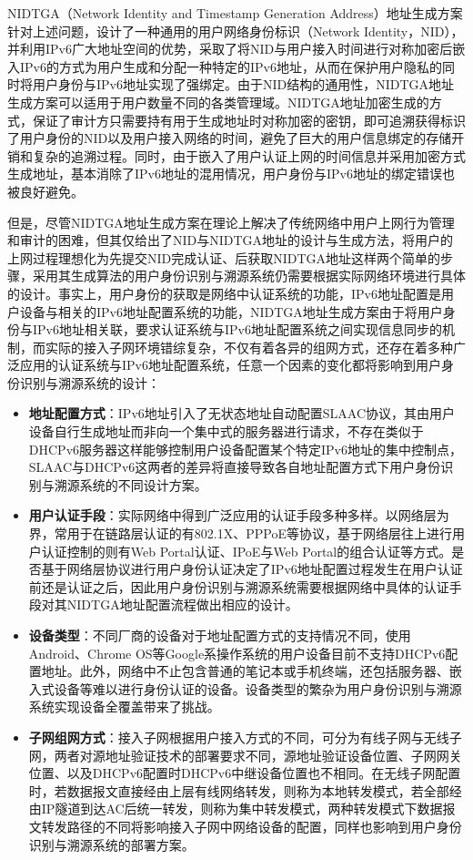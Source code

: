   NIDTGA（Network Identity and Timestamp Generation Address）地址生成方案\cite{liu2015building}针对上述问题，设计了一种通用的用户网络身份标识（Network Identity，NID），并利用IPv6广大地址空间的优势，采取了将NID与用户接入时间进行对称加密后嵌入IPv6的方式为用户生成和分配一种特定的IPv6地址，从而在保护用户隐私的同时将用户身份与IPv6地址实现了强绑定。由于NID结构的通用性，NIDTGA地址生成方案可以适用于用户数量不同的各类管理域。NIDTGA地址加密生成的方式，保证了审计方只需要持有用于生成地址时对称加密的密钥，即可追溯获得标识了用户身份的NID以及用户接入网络的时间，避免了巨大的用户信息绑定的存储开销和复杂的追溯过程。同时，由于嵌入了用户认证上网的时间信息并采用加密方式生成地址，基本消除了IPv6地址的混用情况，用户身份与IPv6地址的绑定错误也被良好避免。

  但是，尽管NIDTGA地址生成方案在理论上解决了传统网络中用户上网行为管理和审计的困难，但其仅给出了NID与NIDTGA地址的设计与生成方法，将用户的上网过程理想化为先提交NID完成认证、后获取NIDTGA地址这样两个简单的步骤，采用其生成算法的用户身份识别与溯源系统仍需要根据实际网络环境进行具体的设计。事实上，用户身份的获取是网络中认证系统的功能，IPv6地址配置是用户设备与相关的IPv6地址配置系统的功能，NIDTGA地址生成方案由于将用户身份与IPv6地址相关联，要求认证系统与IPv6地址配置系统之间实现信息同步的机制，而实际的接入子网环境错综复杂，不仅有着各异的组网方式，还存在着多种广泛应用的认证系统与IPv6地址配置系统，任意一个因素的变化都将影响到用户身份识别与溯源系统的设计：
  \begin{itemize}
    \item \textbf{地址配置方式}：IPv6地址引入了无状态地址自动配置SLAAC协议，其由用户设备自行生成地址而非向一个集中式的服务器进行请求，不存在类似于DHCPv6服务器这样能够控制用户设备配置某个特定IPv6地址的集中控制点，SLAAC与DHCPv6这两者的差异将直接导致各自地址配置方式下用户身份识别与溯源系统的不同设计方案。
    \item \textbf{用户认证手段}：实际网络中得到广泛应用的认证手段多种多样。以网络层为界，常用于在链路层认证的有802.1X\cite{ieee802ieee}、PPPoE\cite{RFC2516}等协议，基于网络层往上进行用户认证控制的则有Web Portal认证、IPoE与Web Portal的组合认证等方式。是否基于网络层协议进行用户身份认证决定了IPv6地址配置过程发生在用户认证前还是认证之后，因此用户身份识别与溯源系统需要根据网络中具体的认证手段对其NIDTGA地址配置流程做出相应的设计。
    \item \textbf{设备类型}：不同厂商的设备对于地址配置方式的支持情况不同，使用Android、Chrome OS等Google系操作系统的用户设备目前不支持DHCPv6配置地址。此外，网络中不止包含普通的笔记本或手机终端，还包括服务器、嵌入式设备等难以进行身份认证的设备。设备类型的繁杂为用户身份识别与溯源系统实现设备全覆盖带来了挑战。
    \item \textbf{子网组网方式}：接入子网根据用户接入方式的不同，可分为有线子网与无线子网，两者对源地址验证技术的部署要求不同，源地址验证设备位置、子网网关位置、以及DHCPv6配置时DHCPv6中继设备位置也不相同。在无线子网配置时，若数据报文直接经由上层有线网络转发，则称为本地转发模式，若全部经由IP隧道到达AC后统一转发，则称为集中转发模式，两种转发模式下数据报文转发路径的不同将影响接入子网中网络设备的配置，同样也影响到用户身份识别与溯源系统的部署方案。
  \end{itemize}

